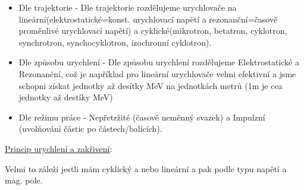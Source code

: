 \begin{itemize}
    \item Dle trajektorie - Dle trajektorie rozdělujeme urychlovače na lineární(elektrostatické=konst. urychlovací napětí a rezonanční=časově proměnlivé urychlovací napětí) a cyklické(mikrotron, betatron, cyklotron, synchrotron, synchocyklotron, izochronní cyklotron).

    \item Dle způsobu urychlení - Dle způsobu urychlení rozdělujeme Elektrostatické a Rezonanční, což je například pro lineární urychlovače velmi efektivní a jsme schopni získat jednotky až desítky MeV na jednotkách metrů (1m je cca jednotky až destíky MeV)

    \item Dle režimu práce - Nepřetržité (časově neměnný svazek) a Impulzní (uvolňování částic po částech/balících).
\end{itemize}

\underline{Princip urychlení a zakřivení}:

Velmi to záleží jestli mám cyklický a nebo lineární a pak podle typu napětí a mag. pole.

